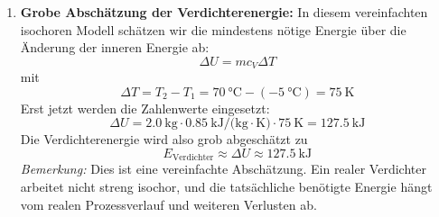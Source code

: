 \documentclass[11pt, a4paper]{article}
\begin{document}
\begin{enumerate}
    \item \textbf{Grobe Abschätzung der Verdichterenergie:}
    In diesem vereinfachten isochoren Modell schätzen wir die mindestens nötige Energie über die Änderung der inneren Energie ab:
    \[
        \Delta U = m c_V \Delta T
    \]
    mit
    \[
        \Delta T = T_2 - T_1 = \SI{70}{\degreeCelsius} - (\SI{-5}{\degreeCelsius}) = \SI{75}{\kelvin}
    \]
    Erst jetzt werden die Zahlenwerte eingesetzt:
    \[
        \Delta U = \SI{2.0}{\kilogram} \cdot \SI{0.85}{\kilo\joule\per(\kilogram\cdot\kelvin)} \cdot \SI{75}{\kelvin} = \SI{127.5}{\kilo\joule}
    \]
    Die Verdichterenergie wird also grob abgeschätzt zu
    \[
        E_{\text{Verdichter}} \approx \Delta U \approx \SI{127.5}{\kilo\joule}
    \]
    \textit{Bemerkung:} Dies ist eine vereinfachte Abschätzung. Ein realer Verdichter arbeitet nicht streng isochor, und die tatsächliche benötigte Energie hängt vom realen Prozessverlauf und weiteren Verlusten ab.
\end{enumerate}

\newpage
\end{document}
